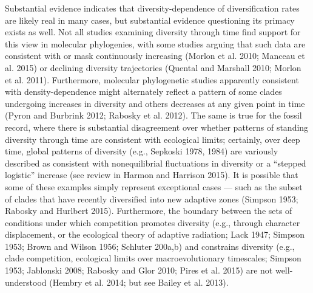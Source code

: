 \documentclass[12pt]{article}
\begin{document}
Substantial evidence indicates that diversity-dependence of diversification
rates are likely real in many cases, but substantial evidence questioning its
primacy exists as well. Not all studies examining diversity through time find
support for this view in molecular phylogenies, with some studies arguing that
such data are consistent with or mask continuously increasing (Morlon et al.
2010; Manceau et al. 2015) or declining diversity trajectories (Quental and
Marshall 2010; Morlon et al. 2011). Furthermore, molecular phylogenetic
studies apparently consistent with density-dependence might alternately
reflect a pattern of some clades undergoing increases in diversity and others
decreases at any given point in time (Pyron and Burbrink 2012; Rabosky et al.
2012). The same is true for the fossil record, where there is substantial
disagreement over whether patterns of standing diversity through time are
consistent with ecological limits; certainly, over deep time, global patterns
of diversity (e.g., Sepkoski 1978, 1984) are variously described as consistent
with nonequilibrial fluctuations in diversity or a “stepped logistic” increase
(see review in Harmon and Harrison 2015). It is possible that some of these
examples simply represent exceptional cases — such as the subset of clades that
have recently diversified into new adaptive zones (Simpson 1953; Rabosky and
Hurlbert 2015). Furthermore, the boundary between the sets of conditions under
which competition promotes diversity (e.g., through character displacement, or
the ecological theory of adaptive radiation; Lack 1947; Simpson 1953; Brown
and Wilson 1956; Schluter 200a,b) and constrains diversity (e.g., clade
competition, ecological limits over macroevolutionary timescales; Simpson
1953; Jablonski 2008; Rabosky and Glor 2010; Pires et al. 2015) are not well-
understood (Hembry et al. 2014; but see Bailey et al. 2013).
\end{document}
